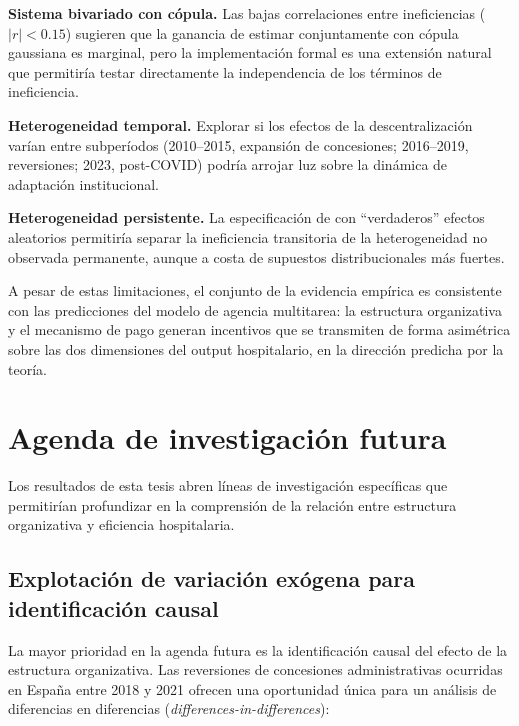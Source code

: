 \textbf{Sistema bivariado con cópula.} Las bajas correlaciones entre ineficiencias ($|r|<0.15$) sugieren que la ganancia de estimar conjuntamente con cópula gaussiana \citep{kumbhakar1997} es marginal, pero la implementación formal es una extensión natural que permitiría testar directamente la independencia de los términos de ineficiencia.

\textbf{Heterogeneidad temporal.} Explorar si los efectos de la descentralización varían entre subperíodos (2010--2015, expansión de concesiones; 2016--2019, reversiones; 2023, post-COVID) podría arrojar luz sobre la dinámica de adaptación institucional.

\textbf{Heterogeneidad persistente.} La especificación de \citet{greene2005a} con ``verdaderos'' efectos aleatorios permitiría separar la ineficiencia transitoria de la heterogeneidad no observada permanente, aunque a costa de supuestos distribucionales más fuertes.

A pesar de estas limitaciones, el conjunto de la evidencia empírica es consistente con las predicciones del modelo de agencia multitarea: la estructura organizativa y el mecanismo de pago generan incentivos que se transmiten de forma asimétrica sobre las dos dimensiones del output hospitalario, en la dirección predicha por la teoría.

\section{Agenda de investigación futura}
\label{sec:agenda_futura}

Los resultados de esta tesis abren líneas de investigación específicas que permitirían profundizar en la comprensión de la relación entre estructura organizativa y eficiencia hospitalaria.

\subsection{Explotación de variación exógena para identificación causal}

La mayor prioridad en la agenda futura es la identificación causal del efecto de la estructura organizativa. Las reversiones de concesiones administrativas ocurridas en España entre 2018 y 2021 ofrecen una oportunidad única para un análisis de diferencias en diferencias (\textit{differences-in-differences}):

